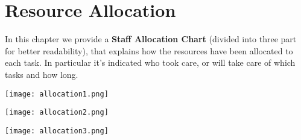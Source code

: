 \pagebreak
\section{Resource Allocation}
In this chapter we provide a \textbf{Staff Allocation Chart} (divided into three part for better readability), that explains how the resources have been allocated to each task. In particular it's indicated who took care, or will take care of which tasks and how long. 

\begin{center}
	\texttt{[image: allocation1.png]}
\end{center}

\begin{center}
	\texttt{[image: allocation2.png]}
\end{center}

\begin{center}
	\texttt{[image: allocation3.png]}
\end{center}
